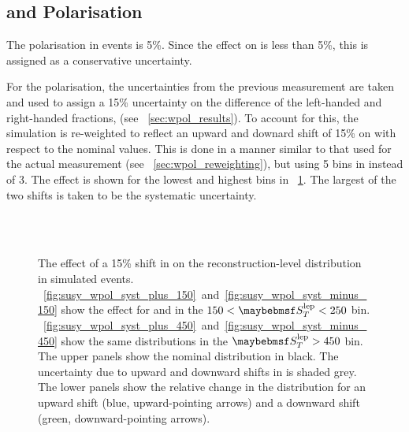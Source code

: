\subsection[\texorpdfstring{\PW}{W} and \texorpdfstring{\ttbar}{tt} Polarisation]{\boldmath{\PW} and \boldmath{\ttbar} Polarisation}
The polarisation in \ttbar events is 5\%. Since the effect on \RCS is less than
5\%, this is assigned as a conservative uncertainty.

For the \PW polarisation, the uncertainties from the previous measurement are taken and
used to assign a 15\% uncertainty on the difference of the left-handed and
right-handed fractions, \fLmfR (see \sec~\ref{sec:wpol_results}). To account for
this, the simulation is re-weighted to reflect an upward and downard shift of
15\% on \fLmfR with respect to the nominal values. This is done in a manner
similar to that used for the actual measurement (see
\sec~\ref{sec:wpol_reweighting}), but using 5 bins in \PtW instead of 3. The
effect is shown for the lowest and highest \STlep bins in
\fig~\ref{fig:susy_wpol_syst}. The largest of the two shifts is taken to be the
systematic uncertainty.

\begin{figure}
\centering
{}
\\
\\
\caption[Effect of a 15\% shift in \fLmfR on the electron \LP distribution]{The effect of a 15\% shift in \fLmfR on
  the reconstruction-level \LP distribution in simulated \Wenu
  events. \figs~\ref{fig:susy_wpol_syst_plus_150}~and~\ref{fig:susy_wpol_syst_minus_150}
  show the effect for \APelectron and \Pelectron in the $150 < \STlep < 250$
  bin. \figs~\ref{fig:susy_wpol_syst_plus_450}~and~\ref{fig:susy_wpol_syst_minus_450}
  show the same distributions in the $\STlep > 450$ bin. The upper panels show
  the nominal \LP distribution in black. The uncertainty due to upward and downward
  shifts in \fLmfR is shaded grey. The lower panels show the relative change
  in the distribution for an upward shift (blue, upward-pointing arrows) and a
  downward shift (green, downward-pointing arrows).}
\label{fig:susy_wpol_syst}
\end{figure}

